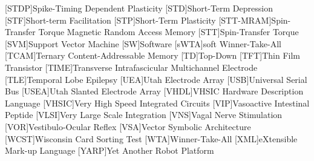[STDP]{Spike-Timing Dependent Plasticity}
[STD]{Short-Term Depression}
[STF]{Short-term Facilitation}
[STP]{Short-Term Plasticity}
[STT-MRAM]{Spin-Transfer Torque Magnetic Random Access Memory}
[STT]{Spin-Transfer Torque}
[SVM]{Support Vector Machine}
[SW]{Software}
[sWTA]{soft Winner-Take-All}
[TCAM]{Ternary Content-Addressable Memory}
[TD]{Top-Down}
[TFT]{Thin Film Transistor}
[TIME]{Transverse Intrafascicular Multichannel Electrode}
[TLE]{Temporal Lobe Epilepsy}
[UEA]{Utah Electrode Array}
[USB]{Universal Serial Bus}
[USEA]{Utah Slanted Electrode Array}
[VHDL]{VHSIC Hardware Description Language}
[VHSIC]{Very High Speed Integrated Circuits}
[VIP]{Vasoactive Intestinal Peptide}
[VLSI]{Very Large Scale Integration}
[VNS]{Vagal Nerve Stimulation}
[VOR]{Vestibulo-Ocular Reflex}
[VSA]{Vector Symbolic Architecture}
[WCST]{Wisconsin Card Sorting Test}
[WTA]{Winner-Take-All}
[XML]{eXtensible Mark-up Language}
[YARP]{Yet Another Robot Platform}
























